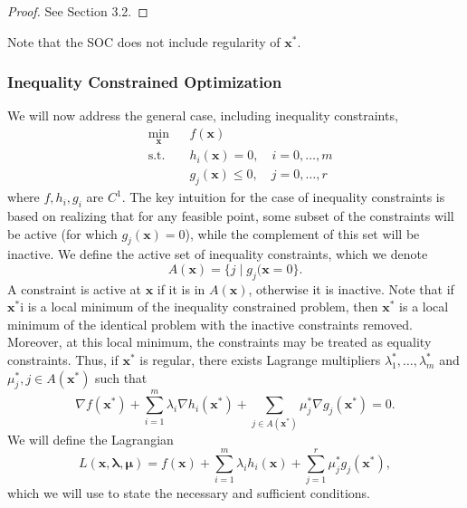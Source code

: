 \begin{proof}
See \cite{bertsekas2016nonlinear} Section 3.2.
\end{proof}
Note that the SOC does not include regularity of $\bm{x}^*$. 

\subsubsection{Inequality Constrained Optimization}

We will now address the general case, including inequality constraints,
\begin{equation*}
\begin{aligned}
& \underset{\bm{x}}{\min}
& & f(\bm{x})\\
& \textrm{s.t.} & & h_i(\bm{x}) = 0, \quad i = 0, \ldots, m\\
& & & g_j(\bm{x}) \leq 0, \quad j = 0, \ldots, r
\end{aligned}
\end{equation*}
where $f,h_i,g_i$ are $C^1$. The key intuition for the case of  inequality constraints is based on realizing that for any feasible point, some subset of the constraints will be active (for which $g_j(\bm{x}) = 0$), while the complement of this set will be inactive. We define the active set of inequality constraints, which we denote 
\begin{equation}
    A(\bm{x}) = \{j \mid g_j(\bm{x} = 0\}.
\end{equation}
A constraint is active at $\bm{x}$ if it is in $A(\bm{x})$, otherwise it is inactive. Note that if $\bm{x}^*$i is a local minimum of the inequality constrained problem, then $\bm{x}^*$ is a local minimum of the identical problem with the inactive constraints removed. Moreover, at this local minimum, the constraints may be treated as equality constraints. Thus, if $\bm{x}^*$ is regular, there exists Lagrange multipliers $\lambda_1^*, \ldots, \lambda_m^*$ and $\mu_j^*, j \in A(\bm{x}^*)$ such that 
\begin{equation}
\nabla f(\bm{x}^*) + \sum^m_{i=1} \lambda_i \nabla h_i(\bm{x}^*) + \sum_{j \in A(\bm{x}^*)} \mu_j^* \nabla g_j(\bm{x}^*)= 0.    
\end{equation}
We will define the Lagrangian
\begin{equation}
    L(\bm{x},\bm{\lambda}, \bm{\mu}) = f(\bm{x}) + \sum^m_{i=1} \lambda_i h_i(\bm{x}) + \sum_{j =1}^r \mu_j^*  g_j(\bm{x}^*),
\end{equation}
which we will use to state the necessary and sufficient conditions. 


